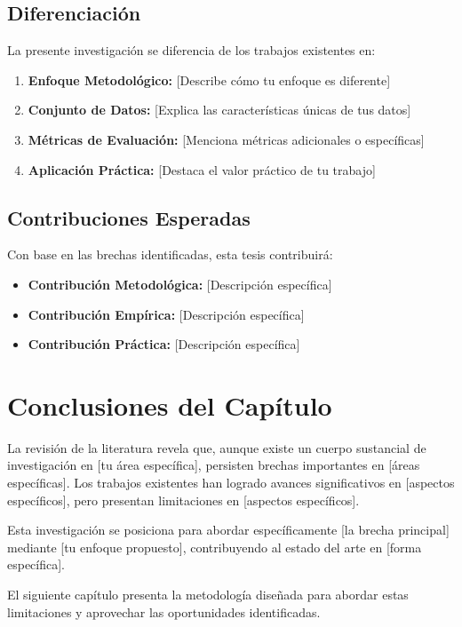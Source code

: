 \subsection{Diferenciación}

La presente investigación se diferencia de los trabajos existentes en:

\begin{enumerate}
    \item \textbf{Enfoque Metodológico:} [Describe cómo tu enfoque es diferente]
    \item \textbf{Conjunto de Datos:} [Explica las características únicas de tus datos]
    \item \textbf{Métricas de Evaluación:} [Menciona métricas adicionales o específicas]
    \item \textbf{Aplicación Práctica:} [Destaca el valor práctico de tu trabajo]
\end{enumerate}

\subsection{Contribuciones Esperadas}

Con base en las brechas identificadas, esta tesis contribuirá:

\begin{itemize}
    \item \textbf{Contribución Metodológica:} [Descripción específica]
    \item \textbf{Contribución Empírica:} [Descripción específica]
    \item \textbf{Contribución Práctica:} [Descripción específica]
\end{itemize}

\section{Conclusiones del Capítulo}

La revisión de la literatura revela que, aunque existe un cuerpo sustancial de investigación en [tu área específica], persisten brechas importantes en [áreas específicas]. Los trabajos existentes han logrado avances significativos en [aspectos específicos], pero presentan limitaciones en [aspectos específicos].

Esta investigación se posiciona para abordar específicamente [la brecha principal] mediante [tu enfoque propuesto], contribuyendo al estado del arte en [forma específica].

El siguiente capítulo presenta la metodología diseñada para abordar estas limitaciones y aprovechar las oportunidades identificadas.
